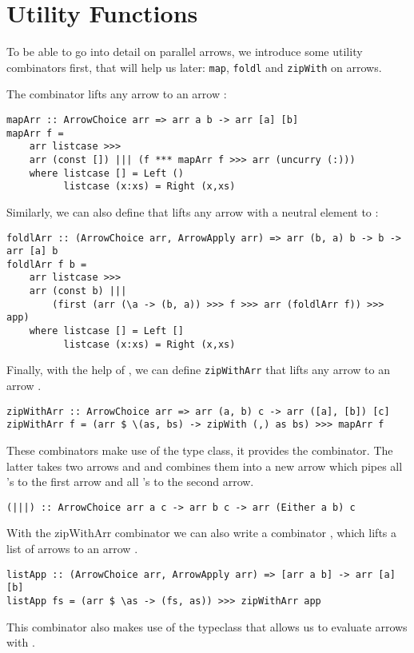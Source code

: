 \section{Utility Functions}\label{utilfns}
To be able to go into detail on parallel arrows, we introduce some utility combinators first, that will help us later: \lstinline{map}, \lstinline{foldl} and \lstinline{zipWith} on arrows.

The  combinator lifts any arrow  to an arrow  \cite{programming_with_arrows}:
\begin{lstlisting}[frame=htrbl]
mapArr :: ArrowChoice arr => arr a b -> arr [a] [b]
mapArr f =
	arr listcase >>>
	arr (const []) ||| (f *** mapArr f >>> arr (uncurry (:)))
	where listcase [] = Left ()
	      listcase (x:xs) = Right (x,xs)
\end{lstlisting}
Similarly, we can also define  that lifts any arrow  with a neutral element  to :
\begin{lstlisting}[frame=htrbl]
foldlArr :: (ArrowChoice arr, ArrowApply arr) => arr (b, a) b -> b -> arr [a] b
foldlArr f b =
	arr listcase >>>
	arr (const b) |||
		(first (arr (\a -> (b, a)) >>> f >>> arr (foldlArr f)) >>> app)
	where listcase [] = Left []
	      listcase (x:xs) = Right (x,xs)
\end{lstlisting}
Finally, with the help of , we can define \lstinline{zipWithArr} that lifts any arrow  to an arrow .
\begin{lstlisting}[frame=htrbl]
zipWithArr :: ArrowChoice arr => arr (a, b) c -> arr ([a], [b]) [c]
zipWithArr f = (arr $ \(as, bs) -> zipWith (,) as bs) >>> mapArr f
\end{lstlisting} %
These combinators make use of the  type class, it provides the \code{|||} combinator. The latter takes two arrows  and  and combines them into a new arrow  which pipes all 's to the first arrow and all 's to the second arrow.
\begin{lstlisting}[frame=htrbl]
(|||) :: ArrowChoice arr a c -> arr b c -> arr (Either a b) c
\end{lstlisting}
With the zipWithArr combinator we can also write a combinator , which lifts a list of arrows \code{[arr a b]} to an arrow .
\begin{lstlisting}[frame=htrbl]
listApp :: (ArrowChoice arr, ArrowApply arr) => [arr a b] -> arr [a] [b]
listApp fs = (arr $ \as -> (fs, as)) >>> zipWithArr app
\end{lstlisting}%
This combinator also makes use of the  typeclass that allows us to evaluate arrows with .

